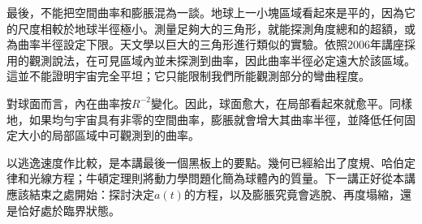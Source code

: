 最後，不能把空間曲率和膨脹混為一談。地球上一小塊區域看起來是平的，因為它的尺度相較於地球半徑極小。測量足夠大的三角形，就能探測角度總和的超額，或為曲率半徑設定下限。天文學以巨大的三角形進行類似的實驗。依照2006年講座採用的觀測說法，在可見區域內並未探測到曲率，因此曲率半徑必定遠大於該區域。這並不能證明宇宙完全平坦；它只能限制我們所能觀測部分的彎曲程度。

對球面而言，內在曲率按\(R^{-2}\)變化。因此，球面愈大，在局部看起來就愈平。同樣地，如果均勻宇宙具有非零的空間曲率，膨脹就會增大其曲率半徑，並降低任何固定大小的局部區域中可觀測到的曲率。

\begin{classroomqa}
\end{classroomqa}

以逃逸速度作比較，是本講最後一個黑板上的要點。幾何已經給出了度規、哈伯定律和光線方程；牛頓定理則將動力學問題化簡為球體內的質量。下一講正好從本講應該結束之處開始：探討決定\(a(t)\)的方程，以及膨脹究竟會逃脫、再度塌縮，還是恰好處於臨界狀態。